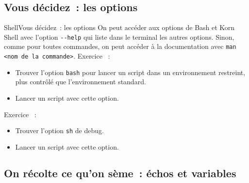 \documentclass{beamer}
\begin{document}
    \subsection{Vous décidez~: les options}\label{subsec:shell-options}

    \begin{frame}[fragile]{Shell}{Vous décidez~: les options}
        On peut accéder aux options de Bash et Korn Shell avec l'option \lstinline{--help} qui liste dans le terminal les autres options.
        \bigbreak
        Sinon, comme pour toutes commandes, on peut accéder à la documentation avec \lstinline{man <nom de la commande>}.
        \bigbreak
        Exercice \execcounterdispinc~:
        \begin{itemize}
            \item Trouver l'option \lstinline{bash} pour lancer un script dans un environnement restreint, plus contrôlé que l'environnement standard.
            \item Lancer un script avec cette option.
        \end{itemize}
        Exercice \execcounterdispinc~:
        \begin{itemize}
            \item Trouver l'option \lstinline{sh} de debug.
            \item Lancer un script avec cette option.
        \end{itemize}
    \end{frame}

    \subsection{On récolte ce qu'on sème~: échos et variables}\label{subsec:recolte}
\end{document}
